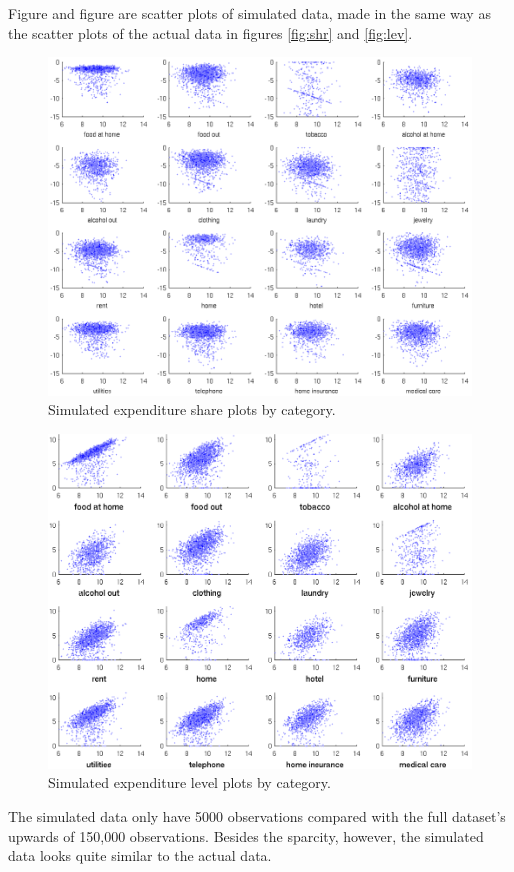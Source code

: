 \documentclass{article}
\begin{document}
Figure and figure are scatter plots of simulated data, made in the same way as the scatter plots of the actual data in figures \ref{fig:shr} and \ref{fig:lev}. 
\begin{figure}
	\begin{center}
		\includegraphics[scale=1]{pics/shares_fake_cropped.pdf}
	\end{center}
	\caption{Simulated expenditure share plots by category.}
	\label{fig:shares_fake}
\end{figure}
\begin{figure}
	\begin{center}
		\includegraphics[scale=1]{pics/levels_fake_cropped.pdf}
	\end{center}
	\caption{Simulated expenditure level plots by category.}
	\label{fig:levels_fake}
\end{figure}
The simulated data only have 5000 observations compared with the full dataset's upwards of 150,000 observations. 
Besides the sparcity, however, the simulated data looks quite similar to the actual data.
\end{document}
